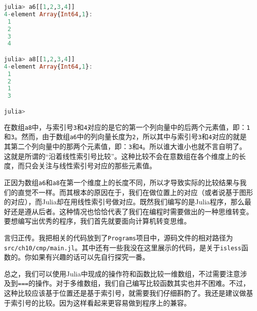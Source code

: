 \begin{lstlisting}[language=julia]
julia> a6[[1,2,3,4]]
4-element Array{Int64,1}:
 1
 2
 3
 4

julia> a8[[1,2,3,4]]
4-element Array{Int64,1}:
 1
 2
 1
 3

julia>
\end{lstlisting}

在数组\verb|a8|中，与索引号\verb|3|和\verb|4|对应的是它的第一个列向量中的后两个元素值，即：\verb|1|和\verb|3|。然而，由于数组\verb|a6|中的列向量长度为\verb|2|，所以其中与索引号\verb|3|和\verb|4|对应的就是其第二个列向量中的那两个元素值，即：\verb|3|和\verb|4|。所以谁大谁小也就不言自明了。这就是所谓的“沿着线性索引号比较”。这种比较不会在意数组在各个维度上的长度，而只会关注与线性索引号对应的那些元素值。

正因为数组\verb|a6|和\verb|a8|在第一个维度上的长度不同，所以才导致实际的比较结果与我们的直觉不一样。而其根本的原因在于，我们在做位置上的对应（或者说基于图形的对应），而Julia却在用线性索引号做对应。既然我们编写的是Julia程序，那么最好还是遵从后者。这种情况也恰恰代表了我们在编程时需要做出的一种思维转变。要想编写出优秀的程序，我们首先就要面向计算机转变思维。

言归正传。我把相关的代码放到了\verb|Programs|项目中，源码文件的相对路径为\verb|src/ch10/cmp/main.jl|。其中还有一些我没在这里展示的代码，是关于\verb|isless|函数的。你如果有兴趣的话可以先自行探究一番。

总之，我们可以使用Julia中现成的操作符和函数比较一维数组，不过需要注意涉及到\verb|===|的操作。对于多维数组，我们自己编写比较函数其实也并不困难。不过，这种比较应该基于位置还是基于索引号，就需要我们仔细斟酌了。我还是建议做基于索引号的比较。因为这样看起来更容易做到程序上的兼容。

